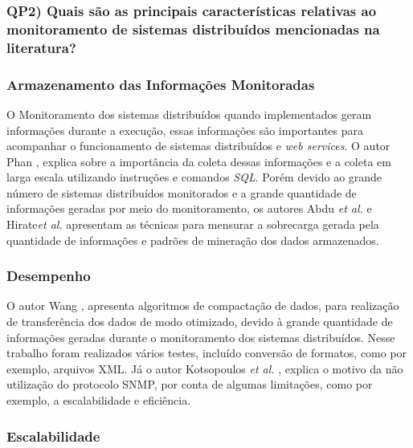 \subsubsection{QP2) Quais são as principais características relativas ao monitoramento de sistemas distribuídos mencionadas na literatura?}

\subsubsection{Armazenamento das Informações Monitoradas}

O Monitoramento dos sistemas distribuídos quando implementados geram informações durante a execução, essas informações são importantes para acompanhar o funcionamento de sistemas distribuídos e \textit{web services}. O autor Phan \cite{phan2009cryptanalysis}, explica sobre a importância da coleta dessas informações e a coleta em larga escala utilizando instruções e comandos \textit{SQL}. Porém devido ao grande número de sistemas distribuídos monitorados e a grande quantidade de informações geradas por meio do monitoramento, os autores Abdu \textit{et al.} e Hirate\textit{et al.} \cite{abdu1996monitoring,hirate2009profiling} apresentam as técnicas para mensurar a sobrecarga gerada pela quantidade de informações e padrões de mineração dos dados armazenados.  

\subsubsection{Desempenho}

O autor Wang \cite{wang2016improvements}, apresenta algoritmos de compactação de dados, para realização de transferência dos dados de modo otimizado, devido à grande quantidade de informações geradas durante o monitoramento dos sistemas distribuídos. Nesse trabalho foram realizados vários testes, incluído conversão de formatos, como por exemplo, arquivos XML. Já o autor Kotsopoulos \textit{et al.} \cite{kotsopoulos2008soa}, explica o motivo da não utilização do protocolo \acrshort{SNMP}, por conta de algumas limitações, como por exemplo, a escalabilidade e eficiência. 

\subsubsection{Escalabilidade}

